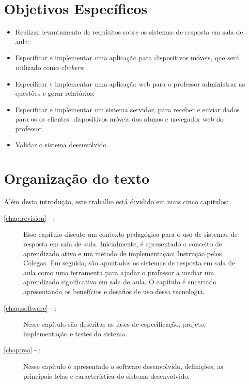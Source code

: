 {\section{Objetivos Específicos}

\begin{itemize}
    \item Realizar levantamento de requisitos sobre os sistemas de resposta em sala de aula;
    \item Especificar e implementar uma aplicação para dispositivos móveis, que será utilizado como \textit{clickers};
    \item Especificar e implementar uma aplicação web para o professor administrar as questões e gerar relatórios;
    \item Especificar e implementar um sistema servidor, para receber e
    enviar dados para os os clientes: dispositivos móveis dos alunos e navegador
    web do professor.
    \item Validar o sistema desenvolvido.
\end{itemize}

\section{Organização do texto}
Além desta introdução, este trabalho está dividido em mais  cinco capítulos:

\begin{description}
  \item[\autoref{chap:revision} - :] Esse capítulo discute um contexto pedagógico
  para o uso de sistemas de resposta em sala de aula. Inicialmente, é
  apresentado o conceito de aprendizado ativo e um método de implementação: Instrução pelos Colegas.
  Em seguida, são apontados os sistemas de resposta em sala de aula como uma
  ferramenta para ajudar o professor a mediar um aprendizado significativo  em
  sala de aula. O capítulo é encerrado apresentando os benefícios e desafios de uso dessa tecnologia.

  \item[\autoref{chap:software} - :] Nesse capítulo são descritas as fases de especificação, projeto, implementação e testes do sistema.

  \item[\autoref{chap:rsa} - :] Nesse capítulo é apresentado o software desenvolvido,
  definições, as principais telas e característica do sistema desenvolvido.


\end{description}}
